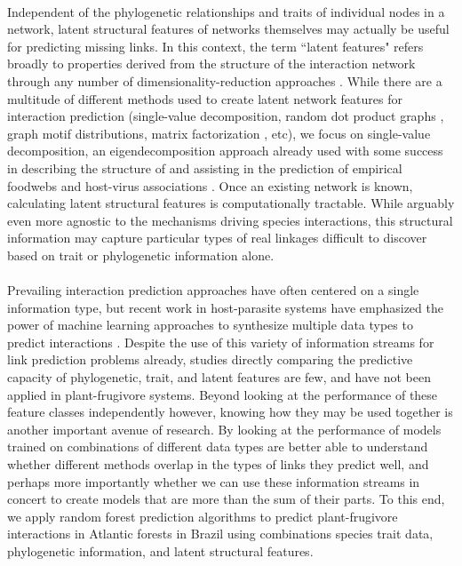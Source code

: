 \paragraph*{}
Independent of the phylogenetic relationships and traits of individual nodes in a network, latent structural features of networks themselves may actually be useful for predicting missing links. In this context, the term ``latent features" refers broadly to properties derived from the structure of the interaction network through any number of dimensionality-reduction approaches \cite{poisot2021imputing}. While there are a multitude of different methods used to create latent network features for interaction prediction (single-value decomposition, random dot product graphs \cite{strydom2022food}, graph motif distributions, matrix factorization \cite{seo2018predicting}, etc), we focus on single-value decomposition, an eigendecomposition approach already used with some success in describing the structure of and assisting in the prediction of empirical foodwebs \cite{banville2023constrains} and host-virus associations \cite{poisot2021imputing, poisot2023network}. Once an existing network is known, calculating latent structural features is computationally tractable. While arguably even more agnostic to the mechanisms driving species interactions, this structural information may capture particular types of real linkages difficult to discover based on trait or phylogenetic information alone. 


\paragraph*{}
Prevailing interaction prediction approaches have often centered on a single information type, but recent work in host-parasite systems have emphasized the power of machine learning approaches to synthesize multiple data types to predict interactions \cite{strydom2021roadmap}. Despite the use of this variety of information streams for link prediction problems already, studies directly comparing the predictive capacity of phylogenetic, trait, and latent features are few, and have not been applied in plant-frugivore systems. Beyond looking at the performance of these feature classes independently however, knowing how they may be used together is another important avenue of research. By looking at the performance of models trained on combinations of different data types are better able to understand whether different methods overlap in the types of links they predict well, and perhaps more importantly whether we can use these information streams in concert to create models that are more than the sum of their parts. To this end, we apply random forest prediction algorithms to predict plant-frugivore interactions in Atlantic forests in Brazil using combinations species trait data, phylogenetic information, and latent structural features. 

